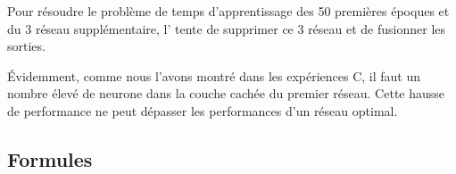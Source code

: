   Pour résoudre le problème de temps d'apprentissage des 50 premières époques et du 3 réseau supplémentaire,
  l' tente de supprimer ce 3 réseau et de fusionner les sorties.
  
  Évidemment, comme nous l'avons montré dans les expériences C, il faut un nombre élevé de neurone dans la couche cachée du premier réseau.
  Cette hausse de performance ne peut dépasser les performances d'un réseau optimal.
  
  

  \newpage 
  \subsection{Formules}
    
    
    
    


